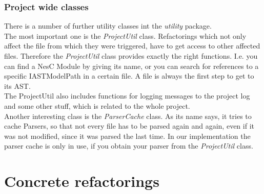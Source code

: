 \documentclass[a4paper,10pt]{report}
\begin{document}
\subsection{Project wide classes}
There is a number of further utility classes int the {\it utility} package.\\
The most important one is the {\it ProjectUtil} class. Refactorings which not only affect the file from which they were triggered, have to get access to other affected files.
Therefore the {\it ProjectUtil} class provides exactly the right functions. I.e. you can find a NesC Module by giving its name, or you can search for references to a specific {IASTModelPath} in a certain file.
A file is always the first step to get to its AST.\\
The {ProjectUtil} also includes functions for logging messages to the project log and some other stuff, which is related to the whole project.\\
Another interesting class is the {\it ParserCache} class. As its name says, it tries to cache Parsers, so that not every file has to be parsed again and again, even if it was not modified, since it was parsed the last time. In our implementation the parser cache is only in use, if you obtain your parser from the {\it ProjectUtil} class. 

\chapter{Concrete refactorings}
\end{document}
